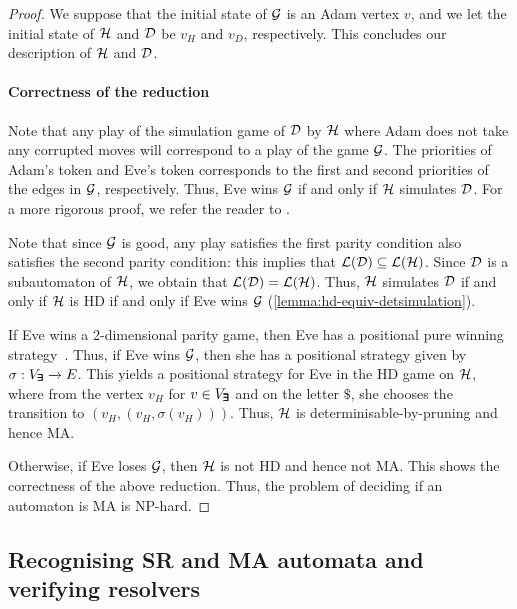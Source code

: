 \begin{proof}
    We suppose that the initial state of $\mathcal{G}$ is an Adam vertex $v$, and we let the initial state of $\mathcal{H}$ and $\mathcal{D}$ be $v_H$ and $v_D$, respectively. This concludes our description of $\mathcal{H}$ and $\mathcal{D}$.

    \paragraph*{Correctness of the reduction}
    Note that any play of the simulation game of $\mathcal{D}$ by $\mathcal{H}$ where Adam does not take any corrupted moves will correspond to a play of the game $\mathcal{G}$. The priorities of Adam's token and Eve's token corresponds to the first and second priorities of the edges in $\mathcal{G}$, respectively. Thus, Eve wins $\mathcal{G}$ if and only if $\mathcal{H}$ simulates $\mathcal{D}$. For a more rigorous proof, we refer the reader to \cite{Pra24a}.  

   Note that since $\mathcal{G}$ is good, any play satisfies the first parity condition also satisfies the second parity condition: this implies that $\mathcal{L}(\mathcal{D}) \subseteq \mathcal{L}(\mathcal{H})$. Since $\mathcal{D}$ is a subautomaton of $\mathcal{H}$, we obtain that $\mathcal{L}(\mathcal{D}) = \mathcal{L}(\mathcal{H})$. Thus, $\mathcal{H}$ simulates $\mathcal{D}$ if and only if $\mathcal{H}$ is HD if and only if Eve wins $\mathcal{G}$ (\cref{lemma:hd-equiv-detsimulation}). 
   
   If Eve wins a 2-dimensional parity game, then Eve has a positional pure winning strategy~\cite[Page 158]{CHP07}. Thus, if Eve wins $\mathcal{G}$, then she has a positional strategy given by $\sigma:V_{\pmb{\exists}} \xrightarrow{} E$. This yields a positional strategy for Eve in the HD game on $\mathcal{H}$, where from the vertex $v_H$ for $v \in V_{\pmb{\exists}}$ and on the letter $\$$, she chooses the transition  to $(v_H,(v_H,\sigma(v_H)))$. Thus, $\mathcal{H}$ is determinisable-by-pruning and hence MA.

   Otherwise, if Eve loses $\mathcal{G}$, then $\mathcal{H}$ is not HD and hence not MA. This shows the correctness of the above reduction. Thus, the problem of deciding if an automaton is MA is NP-hard.
\end{proof}

\subsection{Recognising SR and MA automata and verifying resolvers}

